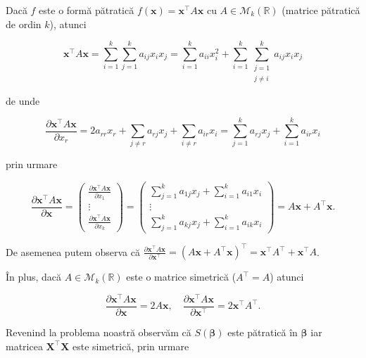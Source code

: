 \documentclass[]{article}
\begin{document}
Dacă \(f\) este o formă pătratică
\(f(\boldsymbol x) = \boldsymbol x^\intercal A \boldsymbol x\) cu
\(A\in\mathcal{M}_{k}(\mathbb{R})\) (matrice pătratică de ordin \(k\)),
atunci

\[
  \boldsymbol x^\intercal  A \boldsymbol x = \sum_{i = 1}^{k}\sum_{j = 1}^{k}a_{ij}x_ix_j = \sum_{i = 1}^{k}a_{ii}x_i^2 + \sum_{i = 1}^{k}\sum_{\substack{j = 1\\ j\neq i}}^{k}a_{ij}x_ix_j 
\]

de unde

\[
  \frac{\partial \boldsymbol x^\intercal  A \boldsymbol x}{\partial x_r} = 2 a_{rr}x_r + \sum_{j\neq r}a_{rj}x_j + \sum_{i\neq r}a_{ir}x_i = \sum_{j = 1}^{k}a_{rj}x_j + \sum_{i = 1}^{k}a_{ir}x_i
\]

prin urmare

\[
  \frac{\partial \boldsymbol x^\intercal  A \boldsymbol x}{\partial \boldsymbol x} = \begin{pmatrix}\frac{\partial \boldsymbol x^\intercal  A \boldsymbol x}{\partial x_1}\\
  \vdots\\
  \frac{\partial \boldsymbol x^\intercal  A \boldsymbol x}{\partial x_k}\end{pmatrix} = \begin{pmatrix}\sum_{j = 1}^{k}a_{1j}x_j + \sum_{i = 1}^{k}a_{i1}x_i\\
  \vdots\\
  \sum_{j = 1}^{k}a_{kj}x_j + \sum_{i = 1}^{k}a_{ik}x_i\end{pmatrix} = A\boldsymbol x + A^\intercal \boldsymbol x.
\]

De asemenea putem observa că
\(\frac{\partial \boldsymbol x^\intercal A \boldsymbol x}{\partial \boldsymbol x^\intercal} = \left(A\boldsymbol x + A^\intercal \boldsymbol x\right)^\intercal = \boldsymbol x^\intercal A^\intercal + \boldsymbol x^\intercal A\).

În plus, dacă \(A\in\mathcal{M}_{k}(\mathbb{R})\) este o matrice
simetrică (\(A^\intercal = A\)) atunci

\[
  \frac{\partial \boldsymbol x^\intercal  A \boldsymbol x}{\partial \boldsymbol x} = 2A\boldsymbol x, \quad \frac{\partial \boldsymbol x^\intercal  A \boldsymbol x}{\partial \boldsymbol x^\intercal} = 2\boldsymbol x^\intercal A^\intercal.
\]

Revenind la problema noastră observăm că \(S(\boldsymbol \beta)\) este
pătratică în \(\boldsymbol \beta\) iar matricea
\(\boldsymbol X^\intercal \boldsymbol X\) este simetrică, prin urmare
\end{document}
